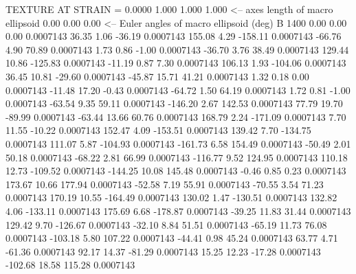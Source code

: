 TEXTURE AT STRAIN =    0.0000
   1.000   1.000   1.000  <-- axes length of macro ellipsoid
    0.00    0.00    0.00  <-- Euler angles of macro ellipsoid (deg)
B      1400
        0.00        0.00        0.00     0.0007143
       36.35        1.06      -36.19     0.0007143
      155.08        4.29     -158.11     0.0007143
      -66.76        4.90       70.89     0.0007143
        1.73        0.86       -1.00     0.0007143
      -36.70        3.76       38.49     0.0007143
      129.44       10.86     -125.83     0.0007143
      -11.19        0.87        7.30     0.0007143
      106.13        1.93     -104.06     0.0007143
       36.45       10.81      -29.60     0.0007143
      -45.87       15.71       41.21     0.0007143
        1.32        0.18        0.00     0.0007143
      -11.48       17.20       -0.43     0.0007143
      -64.72        1.50       64.19     0.0007143
        1.72        0.81       -1.00     0.0007143
      -63.54        9.35       59.11     0.0007143
     -146.20        2.67      142.53     0.0007143
       77.79       19.70      -89.99     0.0007143
      -63.44       13.66       60.76     0.0007143
      168.79        2.24     -171.09     0.0007143
        7.70       11.55      -10.22     0.0007143
      152.47        4.09     -153.51     0.0007143
      139.42        7.70     -134.75     0.0007143
      111.07        5.87     -104.93     0.0007143
     -161.73        6.58      154.49     0.0007143
      -50.49        2.01       50.18     0.0007143
      -68.22        2.81       66.99     0.0007143
     -116.77        9.52      124.95     0.0007143
      110.18       12.73     -109.52     0.0007143
     -144.25       10.08      145.48     0.0007143
       -0.46        0.85        0.23     0.0007143
      173.67       10.66      177.94     0.0007143
      -52.58        7.19       55.91     0.0007143
      -70.55        3.54       71.23     0.0007143
      170.19       10.55     -164.49     0.0007143
      130.02        1.47     -130.51     0.0007143
      132.82        4.06     -133.11     0.0007143
      175.69        6.68     -178.87     0.0007143
      -39.25       11.83       31.44     0.0007143
      129.42        9.70     -126.67     0.0007143
      -32.10        8.84       51.51     0.0007143
      -65.19       11.73       76.08     0.0007143
     -103.18        5.80      107.22     0.0007143
      -44.41        0.98       45.24     0.0007143
       63.77        4.71      -61.36     0.0007143
       92.17       14.37      -81.29     0.0007143
       15.25       12.23      -17.28     0.0007143
     -102.68       18.58      115.28     0.0007143

